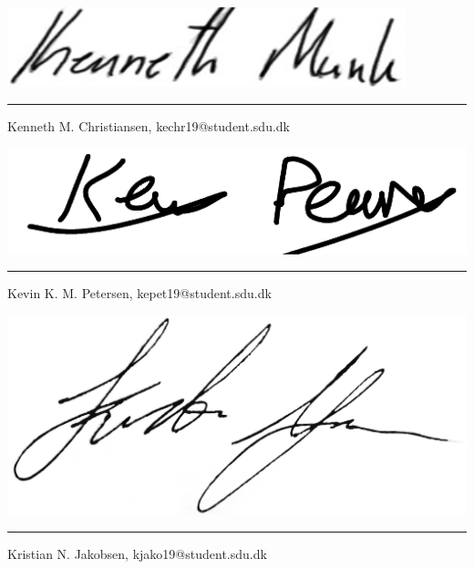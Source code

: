 \noindent
\includegraphics[scale=0.3]{figures/signatures/signature_kechr19.PNG}
\vspace{-5mm}
\par\noindent\rule{\textwidth}{0.4pt}
\noindent
Kenneth M. Christiansen, kechr19@student.sdu.dk\\
\vspace{3.5mm}

\vspace{-6.5mm}
\noindent
\includegraphics[scale=0.3]{figures/signatures/signature_kepet19.png}
\vspace{-8mm}
\par\noindent\rule{\textwidth}{0.4pt}
\noindent
Kevin K. M. Petersen, kepet19@student.sdu.dk

\noindent
\includegraphics[scale=0.04]{figures/signatures/signature_kjako19.jpg}
\vspace{-9.5mm}
\par\noindent\rule{\textwidth}{0.4pt}
\noindent
Kristian N. Jakobsen, kjako19@student.sdu.dk\\

